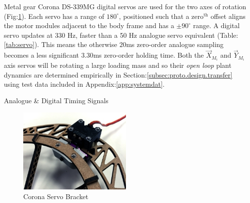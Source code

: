 \par
Metal gear Corona DS-339MG digital servos are used for the two axes of rotation (Fig:\ref{fig:motor-servo}). Each servo has a range of $180^{\circ}$, positioned such that a $\text{zero}^{\text{th}}$ offset aligns the motor modules  adjacent to the body frame and has a $\pm 90^{\circ}$ range. A digital servo updates at 330 Hz, faster than a 50 Hz analogue servo equivalent (Table:\ref{tab:servo}). This means the otherwise $20$ms zero-order analogue sampling becomes a less significant $3.30$ms zero-order holding time. Both the $\vec{X}_{M_i}$ and $\vec{Y}_{M_i}$ axis servos will be rotating a large loading mass and so their \emph{open loop} plant dynamics are determined empirically in Section:\ref{subsec:proto.design.transfer} using test data included in Appendix:\ref{app:systemdat}.
\begin{table}[h]
\centering
{}
\caption{Analogue \& Digital Timing Signals}
\label{tab:servo}
\end{table}
\begin{figure}[htbp]
\centering
\includegraphics[width=0.5\textwidth]{figs/motor-servo}
\caption{Corona Servo Bracket}
\label{fig:motor-servo}
\end{figure}
